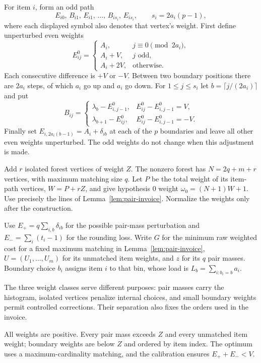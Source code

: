 For item $i$, form an odd path
\[
 E_{i0},\,B_{i1},\,E_{i1},\,\ldots,\,
 B_{is_i},\,E_{is_i},\qquad s_i=2a_i(p-1),
\]
where each displayed symbol also denotes that vertex's weight.
First define unperturbed even weights
\[
 E^0_{ij}=
 \begin{cases}
 A_i,&j\equiv0\pmod{2a_i},\\
 A_i+V,&j\text{ odd},\\
 A_i+2V,&\text{otherwise}.
 \end{cases}
\]
Each consecutive difference is $+V$ or $-V$.
Between two boundary positions there are $2a_i$ steps,
of which $a_i$ go up and $a_i$ go down.
For $1\le j\le s_i$ let $b=\lceil j/(2a_i)\rceil$ and put
\[
 B_{ij}=
 \begin{cases}
 \lambda_b-E^0_{i,j-1},&E^0_{ij}-E^0_{i,j-1}=V,\\
 \lambda_{b+1}-E^0_{ij},&E^0_{ij}-E^0_{i,j-1}=-V.
 \end{cases}
\]
Finally set
$E_{i,2a_i(b-1)}=A_i+\delta_{ib}$ at each of the $p$ boundaries
and leave all other even weights unperturbed.
The odd weights do not change when this adjustment is made.

Add $r$ isolated forest vertices of weight $Z$.
The nonzero forest has $N=2q+m+r$ vertices, with maximum matching
size $q$. Let $P$ be the total weight of its item-path vertices,
$W=P+rZ$, and give hypothesis $0$ weight
$\omega_0=(N+1)W+1$.
Use precisely the lines of Lemma~\ref{lem:pair-invoice}.
Normalize the weights only after the construction.


Use $E_+=q\sum_{i,b}\delta_{ib}$ for the possible pair-mass
perturbation and $E_-=\sum_i(t_i-1)$ for the rounding loss.
Write $G$ for the minimum raw weighted cost for a fixed maximum
matching in Lemma~\ref{lem:pair-invoice}, $U=(U_1,\ldots,U_m)$ for
its unmatched item weights, and $z$ for its $q$ pair masses. Boundary choice $b_i$
assigns item $i$ to that bin, whose load is
$L_b=\sum_{i:b_i=b}a_i$.

The three weight classes serve different purposes: pair masses
carry the histogram, isolated vertices penalize internal choices, and
small boundary weights permit controlled corrections. Their separation
also fixes the orders used in the invoice.

\begin{proposition}
\label{prop:average-normalization}
All weights are positive. Every pair mass exceeds $Z$ and every
unmatched item weight; boundary weights are below $Z$ and ordered by
item index. The optimum uses a maximum-cardinality matching, and the
calibration ensures $E_++E_-<V$.
\end{proposition}

